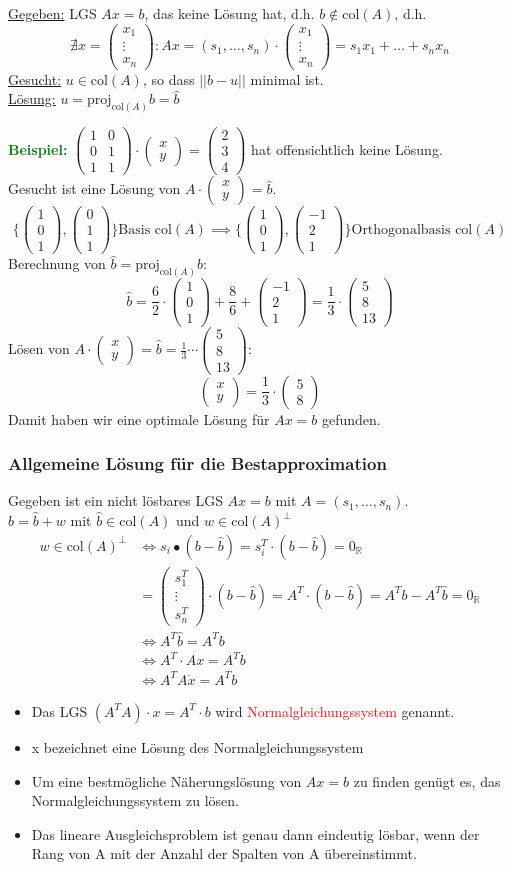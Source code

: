 \documentclass{article}
\newcommand{\red}[1]{\textcolor{red}{#1}}
\newcommand{\green}[1]{\textcolor{green}{#1}}
\newcommand{\ex}{\green{\textbf{Beispiel: }}}
\newcommand{\R}{\mathbb{R}}
\newcommand{\no}[1]{||#1||}
\newcommand{\vvec}[2]{\begin{pmatrix}#1\\#2\end{pmatrix}}
\newcommand{\vvvec}[3]{\begin{pmatrix}#1\\#2\\#3\end{pmatrix}}
\newcommand{\col}{\text{col}}
\newcommand{\pro}{\text{proj}}
\begin{document}
\underline{Gegeben:} LGS $Ax = b$, das keine Lösung hat, d.h. $b \notin \col(A)$, d.h.
\[
    \nexists x = \vvvec{x_1}{\vdots}{x_n}: Ax = (s_1, \dots, s_n) \cdot \vvvec{x_1}{\vdots}{x_n} = s_1x_1 + \dots + s_nx_n
\]
\underline{Gesucht:} $u \in \col(A)$, so dass $\no{b-u}$ minimal ist.\\
\underline{Lösung:} $u = \pro_{\col(A)}b = \hat{b}$

\ex $\begin{pmatrix}
    1 & 0\\
    0 & 1\\
    1 & 1
\end{pmatrix} \cdot \vvec{x}{y} = \vvvec{2}{3}{4}$ hat offensichtlich keine Lösung.\\
Gesucht ist eine Lösung von $A \cdot \vvec{x}{y} = \hat{b}$.
\[
    \{\vvvec{1}{0}{1}, \vvvec{0}{1}{1}\} \text {Basis } \col(A) \implies \{\vvvec{1}{0}{1}, \vvvec{-1}{2}{1}\} \text {Orthogonalbasis } \col(A)  
\]
Berechnung von $\hat{b} = \pro_{\col(A)}b$:
\[
    \hat{b} = \frac{6}{2} \cdot \vvvec{1}{0}{1} + \frac{8}{6} + \vvvec{-1}{2}{1} = \frac{1}{3} \cdot \vvvec{5}{8}{13}
\]
Lösen von $A \cdot \vvec{x}{y} = \hat{b} = \frac{1}{3} \cdots \vvvec{5}{8}{13}$:
\[
    \vvec{x}{y} = \frac{1}{3} \cdot \vvec{5}{8}
\]
Damit haben wir eine optimale Lösung für $Ax = b$ gefunden.

\subsubsection{Allgemeine Lösung für die Bestapproximation}

Gegeben ist ein nicht lösbares LGS $Ax = b$ mit $A = (s_1, \dots, s_n)$.\\
$b = \hat{b} + w$ mit $\hat{b} \in \col(A)$ und $w \in \col(A)^{\perp}$
\begin{align*}
        w \in \col(A)^{\perp} &\iff s_i \bullet (b- \hat{b}) = s_i^T \cdot (b - \hat{b}) = 0_{\R}\\
        &= \vvvec{s_1^T}{\vdots}{s_n^T} \cdot (b - \hat{b}) = A^T \cdot (b - \hat{b}) = A^Tb - A^T \hat{b} = 0_{\R}\\
        &\iff A^T\hat{b} = A^Tb\\
        &\iff A^T \cdot Ax = A^Tb\\
        &\iff A^TA \dot x = A^Tb
\end{align*}
\begin{itemize}
    \item Das LGS $(A^TA) \cdot x = A^T \cdot b$ wird \red{Normalgleichungssystem} genannt.
    \item x bezeichnet eine Lösung des Normalgleichungssystem
    \item Um eine bestmögliche Näherungslösung von $Ax = b$ zu finden genügt es, das Normalgleichungssystem zu lösen.
    \item Das lineare Ausgleichsproblem ist genau dann eindeutig lösbar, wenn der Rang von A mit der Anzahl der Spalten von A übereinstimmt.
\end{itemize}
\end{document}
